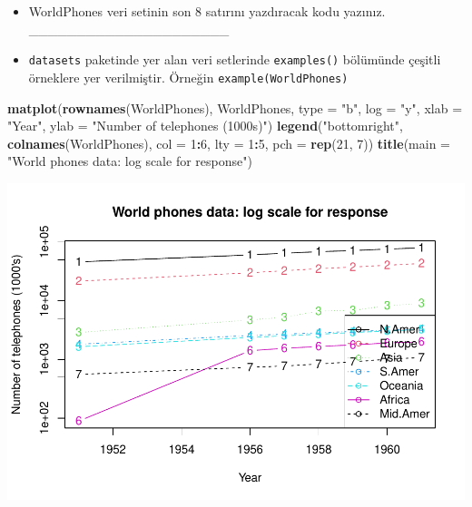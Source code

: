 \documentclass[
  oneside]{book}
\newenvironment{Shaded}{\begin{snugshade}}{\end{snugshade}}
\newcommand{\AttributeTok}[1]{\textcolor[rgb]{0.13,0.29,0.53}{#1}}
\newcommand{\DecValTok}[1]{\textcolor[rgb]{0.00,0.00,0.81}{#1}}
\newcommand{\FunctionTok}[1]{\textcolor[rgb]{0.13,0.29,0.53}{\textbf{#1}}}
\newcommand{\NormalTok}[1]{#1}
\newcommand{\SpecialCharTok}[1]{\textcolor[rgb]{0.81,0.36,0.00}{\textbf{#1}}}
\newcommand{\StringTok}[1]{\textcolor[rgb]{0.31,0.60,0.02}{#1}}
\begin{document}
\begin{itemize}
\item
  WorldPhones veri setinin son 8 satırını yazdıracak kodu yazınız. \_\_\_\_\_\_\_\_\_\_\_\_\_\_\_\_\_\_\_\_\_
\item
  \texttt{datasets} paketinde yer alan veri setlerinde \texttt{examples()} bölümünde çeşitli örneklere yer verilmiştir. Örneğin \texttt{example(WorldPhones)}
\end{itemize}

\begin{Shaded}
\begin{Highlighting}[]
\FunctionTok{matplot}\NormalTok{(}\FunctionTok{rownames}\NormalTok{(WorldPhones), WorldPhones, }\AttributeTok{type =} \StringTok{"b"}\NormalTok{, }\AttributeTok{log =} \StringTok{"y"}\NormalTok{,}
        \AttributeTok{xlab =} \StringTok{"Year"}\NormalTok{, }\AttributeTok{ylab =} \StringTok{"Number of telephones (1000\textquotesingle{}s)"}\NormalTok{)}
\FunctionTok{legend}\NormalTok{(}\StringTok{"bottomright"}\NormalTok{, }\FunctionTok{colnames}\NormalTok{(WorldPhones), }\AttributeTok{col =} \DecValTok{1}\SpecialCharTok{:}\DecValTok{6}\NormalTok{, }\AttributeTok{lty =} \DecValTok{1}\SpecialCharTok{:}\DecValTok{5}\NormalTok{,}
       \AttributeTok{pch =} \FunctionTok{rep}\NormalTok{(}\DecValTok{21}\NormalTok{, }\DecValTok{7}\NormalTok{))}
\FunctionTok{title}\NormalTok{(}\AttributeTok{main =} \StringTok{"World phones data: log scale for response"}\NormalTok{)}
\end{Highlighting}
\end{Shaded}

\begin{center}\includegraphics[width=1\linewidth]{07-veriseti_files/figure-latex/unnamed-chunk-18-1} \end{center}
\end{document}
